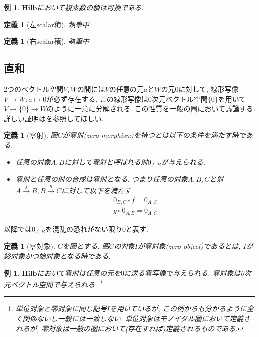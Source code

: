 \documentclass[a4paper,12pt]{ltjsarticle}
\theoremstyle{break}
\newtheorem{defn}[thm]{定義}
\newtheorem{eg}[thm]{例}
\newcommand{\hilb}{\mathbf{Hilb}}
\newcommand{\xr}[1]{\xrightarrow{#1}}
\newcommand{\ci}{\circ}
\newcommand{\mt}{\mapsto}
\numberwithin{equation}{section}
\begin{document}
\begin{eg}
  $\hilb$において複素数の積は可換である. 
\end{eg} 

\begin{defn}[左scalar積]
  執筆中
\end{defn}

\begin{defn}[右scalar積]
  執筆中
\end{defn}

\subsection{直和}

2つのベクトル空間$V,W$の間には$V$の任意の元$a$と$W$の元$0$に対して, 線形写像$V \to W: a\mt 0$が必ず存在する. 
この線形写像は0次元ベクトル空間$\{ 0 \}$を用いて$V \to \{0\} \to W$のように一意に分解される. 
この性質を一般の圏において議論する. 
詳しい証明は\cite{gihou}を参照してほしい. 

\begin{defn}[零射]
  圏$C$が零射(zero morphism)を持つとは以下の条件を満たす時である. 
  \begin{itemize}
    \item 任意の対象$A,B$に対して零射と呼ばれる射$0_{A,B}$が与えられる.
    \item 零射と任意の射の合成は零射となる. 
    つまり任意の対象$A,B,C$と射$A \xr{f} B, B \xr{g} C$に対して以下を満たす. 
    \begin{align*}
      0_{B,C} \ci f = 0_{A,C} \\
      g \ci 0_{A,B} = 0_{A,C}
    \end{align*}
  \end{itemize}
\end{defn}

以降では$0_{A,B}$を混乱の恐れがない限り$0$と表す. 

\begin{defn}[零対象]
  $C$を圏とする. 
  圏$C$の対象$I$が零対象(zero object)であるとは, $I$が終対象かつ始対象となる時である. 
\end{defn}

\begin{eg}
  $\hilb$において零射は任意の元を$0$に送る零写像で与えられる. 
  零対象は0次元ベクトル空間で与えられる. 
  \footnote{
    単位対象と零対象に同じ記号$I$を用いているが, この例からも分かるように全く関係ないし一般には一致しない. 
    単位対象はモノイダル圏において定義されるが, 零対象は一般の圏において(存在すれば)定義されるものである. 
  }
\end{eg}
\end{document}
